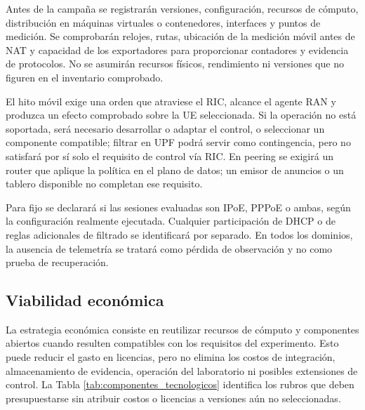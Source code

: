 Antes de la campaña se registrarán versiones, configuración, recursos de cómputo, distribución en máquinas virtuales o contenedores, interfaces y puntos de medición. Se comprobarán relojes, rutas, ubicación de la medición móvil antes de NAT y capacidad de los exportadores para proporcionar contadores y evidencia de protocolos. No se asumirán recursos físicos, rendimiento ni versiones que no figuren en el inventario comprobado.

El hito móvil exige una orden que atraviese el RIC, alcance el agente RAN y produzca un efecto comprobado sobre la UE seleccionada. Si la operación no está soportada, será necesario desarrollar o adaptar el control, o seleccionar un componente compatible; filtrar en UPF podrá servir como contingencia, pero no satisfará por sí solo el requisito de control vía RIC. En peering se exigirá un router que aplique la política en el plano de datos; un emisor de anuncios o un tablero disponible no completan ese requisito.

Para fijo se declarará si las sesiones evaluadas son IPoE, PPPoE o ambas, según la configuración realmente ejecutada. Cualquier participación de DHCP o de reglas adicionales de filtrado se identificará por separado. En todos los dominios, la ausencia de telemetría se tratará como pérdida de observación y no como prueba de recuperación.

\subsection{Viabilidad económica}

La estrategia económica consiste en reutilizar recursos de cómputo y componentes abiertos cuando resulten compatibles con los requisitos del experimento. Esto puede reducir el gasto en licencias, pero no elimina los costos de integración, almacenamiento de evidencia, operación del laboratorio ni posibles extensiones de control. La Tabla \ref{tab:componentes_tecnologicos} identifica los rubros que deben presupuestarse sin atribuir costos o licencias a versiones aún no seleccionadas.

